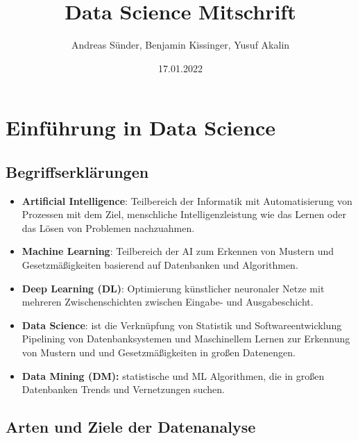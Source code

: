\documentclass[
]{article}
\title{Data Science Mitschrift}
\author{Andreas Sünder, Benjamin Kissinger, Yusuf Akalin}
\date{17.01.2022}
\begin{document}
\maketitle

{
\setcounter{tocdepth}{5}
\tableofcontents
}
\graphicspath{ {./Bilder/} }

\newenvironment{conditions}[1][wobei:]
  {#1 \begin{tabular}[t]{>{$}l<{$} @{${} \quad ... \quad {}$} l}}
  {\end{tabular}\\[\belowdisplayskip]}

\clearpage

\hypertarget{einfuxfchrung-in-data-science}{%
\section{Einführung in Data
Science}\label{einfuxfchrung-in-data-science}}

\hypertarget{begriffserkluxe4rungen}{%
\subsection{Begriffserklärungen}\label{begriffserkluxe4rungen}}

\begin{itemize}
\item
  \textbf{Artificial Intelligence}: Teilbereich der Informatik mit
  Automatisierung von Prozessen mit dem Ziel, menschliche
  Intelligenzleistung wie das Lernen oder das Lösen von Problemen
  nachzuahmen.
\item
  \textbf{Machine Learning}: Teilbereich der AI zum Erkennen von Mustern
  und Gesetzmäßigkeiten basierend auf Datenbanken und Algorithmen.
\item
  \textbf{Deep Learning (DL)}: Optimierung künstlicher neuronaler Netze
  mit mehreren Zwischenschichten zwischen Eingabe- und Ausgabeschicht.
\item
  \textbf{Data Science}: ist die Verknüpfung von Statistik und
  Softwareentwicklung Pipelining von Datenbanksystemen und Maschinellem
  Lernen zur Erkennung von Mustern und und Gesetzmäßigkeiten in großen
  Datenengen.
\item
  \textbf{Data Mining (DM):} statistische und ML Algorithmen, die in
  großen Datenbanken Trends und Vernetzungen suchen.
\end{itemize}

\hypertarget{arten-und-ziele-der-datenanalyse}{%
\subsection{Arten und Ziele der
Datenanalyse}\label{arten-und-ziele-der-datenanalyse}}
\end{document}
